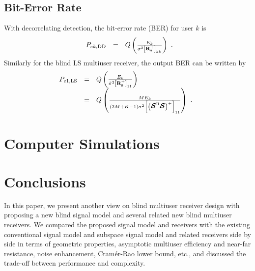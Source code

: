 \documentclass[a4paper,10pt,fleqn, twocolumn]{IEEETran}
\newcommand{\bs}{{\bf s}}
\newcommand{\bR}{{\bf R}}
\newcommand{\bcS}{{\mbox {\boldmath ${\cal S}$}}}
\begin{document}
\subsection{Bit-Error Rate}
With decorrelating detection, the bit-error rate (BER) for user
$k$ is
\begin{equation}
\begin{array}{rcl}
P_{ek,\rm\small DD} &=&
Q\left(\frac{E_{k}}{\sigma^{2}\left[\bR_{\bs}^{+}\right]_{kk}}\right)
\end{array}.\label{BER_DD}
\end{equation}
\noindent Similarly for the blind LS multiuser receiver, the
output BER can be written by
\begin{equation}\hspace{-0.07in}
\begin{array}{rcl}
P_{e1,\rm\small LS} &=&
Q\left(\frac{E_{k}}{\tilde\sigma^{2}\left[\bR_{\tilde\bs}^{+}\right]_{11}}\right)\\
&=&
Q\left(\frac{ME_{k}}{\left(2M+K-1\right)\sigma^{2}\left[\left(\bcS^{\rm
H}\bcS\right)^{+}\right]_{11}}\right)\ .
\end{array}\label{BER_LS}
\end{equation}

\section{Computer Simulations}
\section{Conclusions}
In this paper, we present another view on blind multiuser receiver
design with proposing a new blind signal model and several related
new blind multiuser receivers. We compared the proposed signal
model and receivers with the existing conventional signal model
and subspace signal model and related receivers side by side in
terms of geometric properties, asymptotic multiuser efficiency and
near-far resistance, noise enhancement, Cram\'{e}r-Rao lower
bound, etc., and discussed the trade-off between performance and
complexity.

\small


\end{document}

